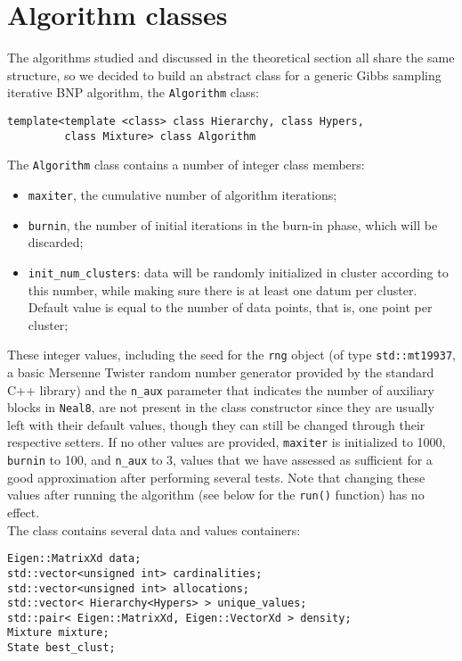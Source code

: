 \section{Algorithm classes}

The algorithms studied and discussed in the theoretical section all share the same structure, so we decided to build an abstract class for a generic Gibbs sampling iterative BNP algorithm, the \verb|Algorithm| class:
\begin{verbatim}
template<template <class> class Hierarchy, class Hypers,
         class Mixture> class Algorithm
\end{verbatim}
The \verb|Algorithm| class contains a number of integer class members:
\begin{itemize}
	\item \verb|maxiter|, the cumulative number of algorithm iterations;
	\item \verb|burnin|, the number of initial iterations in the burn-in phase, which will be discarded;
	\item \verb|init_num_clusters|: data will be randomly initialized in cluster according to this number, while making sure there is at least one datum per cluster.
	Default value is equal to the number of data points, that is, one point per cluster;
\end{itemize}
These integer values, including the seed for the \verb|rng| object (of type \verb|std::mt19937|, a basic Mersenne Twister random number generator provided by the standard C++ library) and the \verb|n_aux| parameter that indicates the number of auxiliary blocks in \verb|Neal8|, are not present in the class constructor since they are usually left with their default values, though they can still be changed through their respective setters.
If no other values are provided, \verb|maxiter| is initialized to 1000, \verb|burnin| to 100, and \verb|n_aux| to 3, values that we have assessed as sufficient for a good approximation after performing several tests.
Note that changing these values after running the algorithm (see below for the \verb|run()| function) has no effect. \\
The class contains several data and values containers: %
\begin{verbatim}
Eigen::MatrixXd data;
std::vector<unsigned int> cardinalities;
std::vector<unsigned int> allocations;
std::vector< Hierarchy<Hypers> > unique_values;
std::pair< Eigen::MatrixXd, Eigen::VectorXd > density;
Mixture mixture;
State best_clust;
\end{verbatim}

